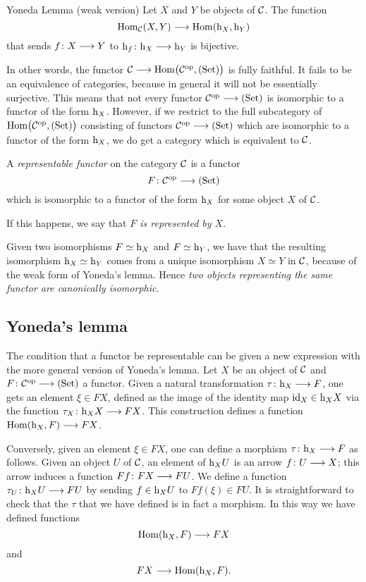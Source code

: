 \begin{2   CONTRAVARIANT FUNCTORS}
\begin{2.1 Yoneda Lemma}
\begin{named}{Yoneda Lemma (weak version)}
Let $X$ and $Y$ be
objects of $\mathcal{C}$. The function
   \[
   \hom_\cC(X, Y) \arr
   \hom (\h_X, \h_Y)
   \]
that sends $f \colon X \arr Y$ to $\h_f \colon \h_X \arr \h_Y$ is bijective. 
\end{named}

In other words, the functor $\cC \arr \func{\cC}$ is fully faithful. It fails to be an equivalence of categories, because in general it will not be essentially surjective. This means that not every functor $\cC\op \arr \catset$ is isomorphic to a functor of the form $\mathrm{h}_X$. However, if we restrict to the full subcategory of $\mathrm{Hom}\bigl(\mathcal{C}^{\mathrm{op}}, (\mathrm{Set})\bigr)$ consisting of functors $\cC\op \arr \catset$ which are isomorphic to a functor of the form $\mathrm{h}_X$, we do get a category which is equivalent to $\mathcal{C}$.

\begin{definition} A \emph{representable functor} on the category $\mathcal{C}$ is a functor
   \[
   F \colon \cC\op \arr \catset
   \] which is isomorphic to a functor of the form $\mathrm{h}_X$ for some object $X$ of $\mathcal{C}$. 

If this happens, we say that \emph{$F$ is represented by $X$}.
\end{definition}

Given two isomorphisms $F \simeq \mathrm{h}_X$ and $F \simeq \mathrm{h}_Y$, we have that the resulting isomorphism $\mathrm{h}_X \simeq \mathrm{h}_Y$ comes from a unique isomorphism $X \simeq Y$ in $\mathcal{C}$, because of the weak form of Yoneda's lemma. Hence \emph{two objects representing the same functor are canonically isomorphic.}
 
\subsection{Yoneda's lemma}

The condition that a functor be representable can be given a new expression with the more general version of Yoneda's lemma. Let $X$ be an object of $\mathcal{C}$ and $F \colon \cC\op \arr \catset$ a functor. Given a natural transformation $\tau\colon \h_X \arr F$, one gets an element $\xi \in F X$, defined as the image of the identity map $\mathrm{id}_X \in \mathrm{h}_X X$ via the function $\tau_X\colon \h_X X \arr F X$. This construction defines a function $\hom(\h_X, F) \arr F X$.
 
Conversely, given an element $\xi\in F X$, one can define a morphism $\tau\colon \h_X \arr F$ as follows. Given an object $U$ of $\mathcal{C}$, an element of $\mathrm{h}_X U$ is an arrow $f\colon U \arr X$; this arrow induces a function $F f \colon F X \arr F U$. We define a function $\tau_{U} \colon \h_X U \arr F U$ by sending $f \in \mathrm{h}_X U$ to $F f(\xi) \in F U$. It is straightforward to check that the $\tau$ that we have defined is in fact a morphism. In this way we have defined functions
   \[
   \hom(\h_X,F) \arr F X
   \]
and
   \[
   F X \arr \hom(\h_X,F).
   \]


\end{2.1 Yoneda Lemma}
\end{2   CONTRAVARIANT FUNCTORS}
